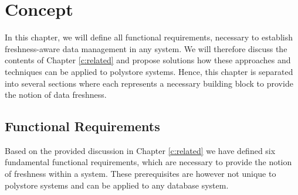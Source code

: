 \chapter{Concept}
\label{c:concept}


In this chapter, we will define all functional requirements, necessary to establish freshness-aware data management in any system.
We will therefore discuss the contents of Chapter \ref{c:related} and propose solutions how these approaches and techniques can be applied to polystore systems.
Hence, this chapter is separated into several sections where each represents a necessary building block to provide the notion of data freshness.


\section{Functional Requirements}

Based on the provided discussion in Chapter \ref{c:related} we have defined six fundamental functional
requirements, which are necessary to provide the notion of freshness within a system.
These prerequisites are however not unique to polystore systems and can be applied to any database system. 

